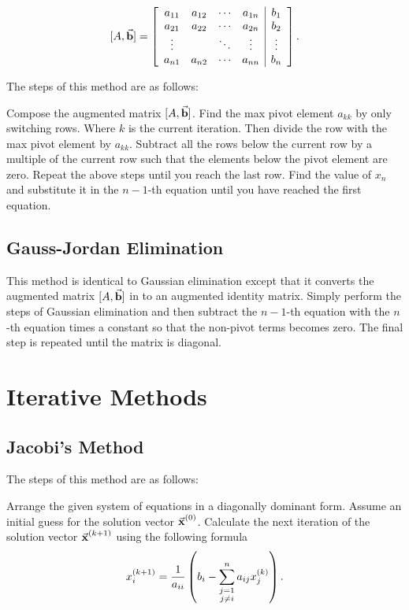 \documentclass{report}
\begin{document}
\[
	[A,\vec{\bm{\mathrm{b}}}] = \left[
		\begin{array}{cccc|c}
			a_{11} & a_{12} & \cdots & a_{1n} & b_1    \\
			a_{21} & a_{22} & \cdots & a_{2n} & b_2    \\
			\vdots &        & \ddots & \vdots & \vdots \\
			a_{n1} & a_{n2} & \cdots & a_{nn} & b_n
		\end{array}
		\right]
	.\]

The steps of this method are as follows:

\begin{enumerate}
	\ii Compose the augmented matrix $[A,\vec{\bm{\mathrm{b}}}]$.
	\ii Find the max pivot element $a_{kk}$ by only switching rows. Where $k$ is the current iteration. Then divide the row with the max pivot element by $a_{kk}$.
	\ii Subtract all the rows below the current row by a multiple of the current row such that the elements below the pivot element are zero.
	\ii Repeat the above steps until you reach the last row.
	\ii Find the value of $x_n$ and substitute it in the $n-1$-th equation until you have reached the first equation.
\end{enumerate}

\subsection{Gauss-Jordan Elimination}

This method is identical to Gaussian elimination except that it converts the augmented matrix $[A,\vec{\bm{\mathrm{b}}}]$ in to an augmented identity matrix. Simply perform the steps of Gaussian elimination and then subtract the $n-1$-th equation with the $n$-th equation times a constant so that the non-pivot terms becomes zero. The final step is repeated until the matrix is diagonal.


\section{Iterative Methods}

\subsection{Jacobi's Method}

The steps of this method are as follows:

\begin{enumerate}
	\ii Arrange the given system of equations in a diagonally dominant form.
	\ii Assume an initial guess for the solution vector $\vec{\bm{\mathrm{x}}}^{(0)}$.
	\ii Calculate the next iteration of the solution vector $\vec{\bm{\mathrm{x}}}^{(k+1)}$ using the following formula
	\[
		x_i^{(k+1)} = \frac{1}{a_{ii}}\left(b_i - \sum_{\substack{j=1\\j\neq i}}^{n}a_{ij}x_j^{(k)}\right)
		.\]
\end{enumerate}
\end{document}
